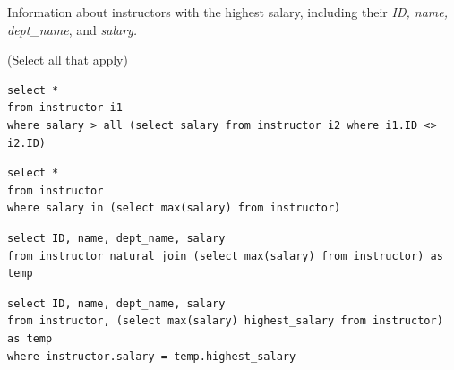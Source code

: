 \documentclass[12pt, addpoints, answers]{exam}
\begin{document}
\begin{questions}
\begin{minipage}{\linewidth}
\question[8]
Information about instructors with the highest salary, including their \textit{ID, name, dept\_name}, and \textit{salary.}\par\vspace{0.5em}
(Select all that apply)\par\vspace{0.5em}
\begin{checkboxes} 
    \choice \begin{verbatim}
select *
from instructor i1
where salary > all (select salary from instructor i2 where i1.ID <> i2.ID)
    \end{verbatim}
    \CorrectChoice \begin{verbatim}
select *
from instructor
where salary in (select max(salary) from instructor)
    \end{verbatim}
    \choice \begin{verbatim}
select ID, name, dept_name, salary
from instructor natural join (select max(salary) from instructor) as temp
    \end{verbatim}
    \CorrectChoice \begin{verbatim}
select ID, name, dept_name, salary
from instructor, (select max(salary) highest_salary from instructor) as temp
where instructor.salary = temp.highest_salary
    \end{verbatim}
\end{checkboxes}
\end{minipage}\vspace{1em}


\end{questions}
\end{document}
